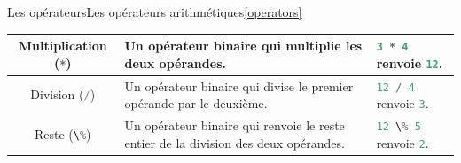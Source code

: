 \documentclass{beamer}
\begin{document}
\begin{frame}{Les opérateurs}{Les opérateurs arithmétiques\cref{operators}}
\begin{tiny}
\begin{table}[h!]
\begin{tabular}{|c|p{4cm}|p{4cm}|}
                    \hline
                    Multiplication (\lstinline[language=Javascript]!*!) & Un opérateur binaire qui multiplie les deux opérandes.                                                                                                                                                                                                                                 & \lstinline[language=Javascript]!3 * 4! renvoie \lstinline[language=Javascript]!12!.                                                                                                                                                                                                                           \\
                    \hline
                    Division (\lstinline[language=Javascript]!/!)       & Un opérateur binaire qui divise le premier opérande par le deuxième.                                                                                                                                                                                                                   & \lstinline[language=Javascript]!12 / 4! renvoie \lstinline[language=Javascript]!3!.                                                                                                                                                                                                                           \\
                    \hline
                    Reste (\lstinline[language=Javascript]!\%!)         & Un opérateur binaire qui renvoie le reste entier de la division des deux opérandes.                                                                                                                                                                                                    & \lstinline[language=Javascript]!12 \% 5! renvoie \lstinline[language=Javascript]!2!.                                                                                                                                                                                                                          \\
                    \hline
                \end{tabular}
            \end{table}
        \end{tiny}
    \end{frame}
\end{document}
